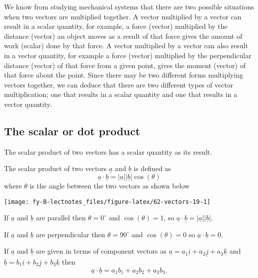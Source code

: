 \documentclass[
  11pt,
  oneside]{book}
\newcommand{\slide}{}
\theoremstyle{definition}
\theoremstyle{definition}
\theoremstyle{definition}
\theoremstyle{definition}
\theoremstyle{remark}
\begin{document}
We know from studying mechanical systems that there are two possible situations when two vectors are multiplied together. A vector multiplied by a vector can result in a scalar quantity, for example, a force (vector) multiplied by the distance (vector) an object moves as a result of that force gives the amount of work (scalar) done by that force. A vector multiplied by a vector can also result in a vector quantity, for example a force (vector) multiplied by the perpendicular distance (vector) of that force from a given point, gives the moment (vector) of that force about the point. Since there may be two different forms multiplying vectors together, we can deduce that there are two different types of vector multiplication; one that results in a scalar quantity and one that results in a vector quantity.

\slide

\subsection{The scalar or dot product}\label{the-scalar-or-dot-product}

The scalar product of two vectors has a scalar quantity as its result.

The scalar product of two vectors \(\underline a\) and \(\underline b\) is defined as
\[
\underline a \cdot\underline b = |\underline a||\underline b|\cos(\theta)
\]
where \(\theta\) is the angle between the two vectors as shown below

\begin{center}\texttt{[image: fy-B-lectnotes\_files/figure-latex/62-vectors-19-1]} \end{center}

If \(\underline a\) and \(\underline b\) are parallel then \(\theta = 0^\circ\) and \(\cos(\theta) = 1\), so \(\underline a \cdot\underline b = |\underline a||\underline b|\).

If \(\underline a\) and \(\underline b\) are perpendicular then \(\theta = 90^\circ\) and \(\cos(\theta) = 0\) so \(\underline a \cdot\underline b = 0\).

\slide

If \(\underline a\) and \(\underline b\) are given in terms of component vectors as \(\underline a = a_1\underline i + a_2\underline j + a_3\underline k\) and \(\underline b = b_1\underline i + b_2\underline j + b_3\underline k\) then
\[
\underline a \cdot\underline b = a_1b_1 + a_2b_2 + a_3b_3.
\]
\slide
\end{document}
